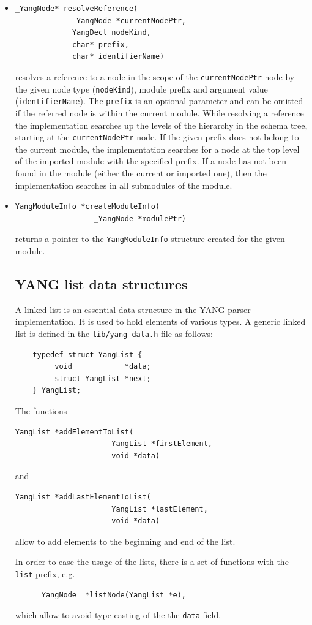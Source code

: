 \documentclass[conference]{IEEEtran}
\begin{document}
\begin{itemize}
\item
\small
\begin{verbatim}
_YangNode* resolveReference(
             _YangNode *currentNodePtr, 
             YangDecl nodeKind, 
             char* prefix, 
             char* identifierName)
\end{verbatim}
\normalsize
resolves a reference to a node in the scope of the \texttt{currentNodePtr} node by the given node type (\texttt{nodeKind}), 
module prefix and argument value (\texttt{identifierName}). The \texttt{prefix} is an optional parameter and can be omitted if the referred node is within the current module.   
While resolving a reference the implementation searches up the levels of the hierarchy in the schema tree, starting at
the \texttt{currentNodePtr} node. If the given prefix does not belong to the current module, the implementation searches for a node at the top level 
of the imported module with the specified prefix.
If a node has not been found in the module (either the current or imported one), then the implementation searches in all submodules of the module.  

\item
\small
\begin{verbatim}
YangModuleInfo *createModuleInfo(
                  _YangNode *modulePtr)
\end{verbatim}
\normalsize
returns a pointer to the \texttt{YangModuleInfo} structure created for the given module.

\subsection{YANG list data structures}
A linked list is an essential data structure in the YANG parser implementation. 
It is used to hold elements of various types. A generic linked list is defined in the \texttt{lib/yang-data.h} file as follows:
\small
\begin{verbatim}
    typedef struct YangList {
         void  	         *data;
         struct YangList *next;
    } YangList;
\end{verbatim}
\normalsize

The functions 
\small
\begin{verbatim}
YangList *addElementToList(
                      YangList *firstElement, 
                      void *data)
\end{verbatim}
\normalsize
and
\small
\begin{verbatim}
YangList *addLastElementToList(
                      YangList *lastElement, 
                      void *data)
\end{verbatim}
\normalsize
allow to add elements to the beginning and end of the list.

In order to ease the usage of the lists, there is a set of functions with the \texttt{list} prefix, e.g.
\small
\begin{verbatim}
     _YangNode  *listNode(YangList *e),
\end{verbatim}
\normalsize
which allow to avoid type casting of the the \texttt{data} field.   

\end{itemize}
\end{document}
